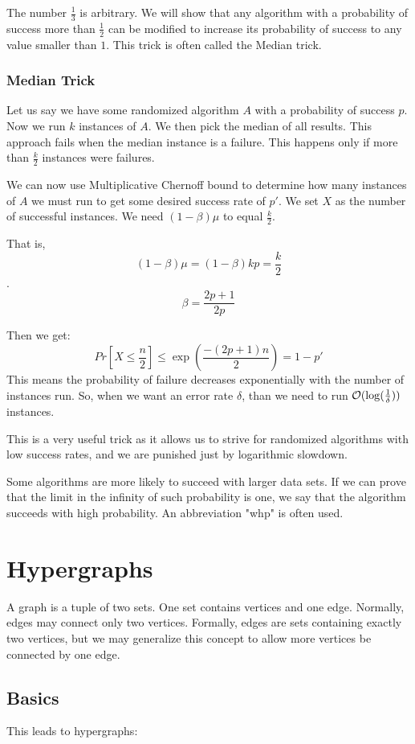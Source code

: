 The number $\frac{1}{3}$ is arbitrary. We will show that any algorithm with a probability of success more than $\frac{1}{2}$ can be modified to increase its probability of success to any value smaller than $1$. This trick is often called the Median trick. 

\subsubsection{Median Trick}

Let us say we have some randomized algorithm $A$ with a probability of success $p$. Now we run $k$ instances of $A$. We then pick the median of all results. This approach fails when the median instance is a failure. This happens only if more than $\frac{k}{2}$ instances were failures. 

We can now use Multiplicative Chernoff bound to determine how many instances of $A$ we must run to get some desired success rate of $p'$. We set $X$ as the number of successful instances. We need $(1-\beta)\mu$ to equal $\frac{k}{2}$. 

That is,
$$(1-\beta)\mu = (1-\beta)kp = \frac{k}{2}$$. 
$$\beta = \frac{2p + 1}{2p}$$


Then we get: $$Pr[X \leq \frac{n}{2}] \leq \exp \left( \frac{-(2p+1)n}{2} \right) = 1 - p'$$
This means the probability of failure decreases exponentially with the number of instances run. So, when we want an error rate $\delta$, than we need to run $\mathcal{O}(\log(\frac{1}{\delta}))$ instances.

This is a very useful trick as it allows us to strive for randomized algorithms with low success rates, and we are punished just by logarithmic slowdown.

Some algorithms are more likely to succeed with larger data sets.  If we can prove that the limit in the infinity of such probability is one, we say that the algorithm succeeds with high probability. An abbreviation "whp" is often used.

\section{Hypergraphs}
A graph is a tuple of two sets. One set contains vertices and one edge. Normally, edges may connect only two vertices. Formally, edges are sets containing exactly two vertices, but we may generalize this concept to allow more vertices be connected by one edge.
\subsection{Basics}
This leads to hypergraphs:

